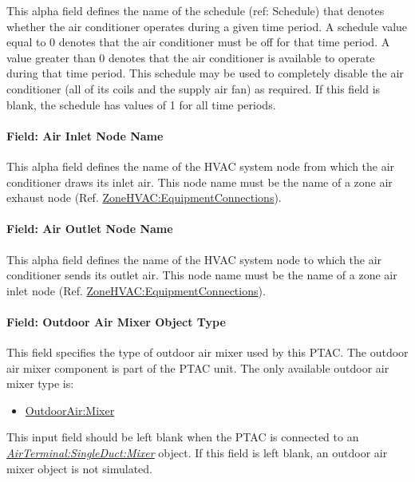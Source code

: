 This alpha field defines the name of the schedule (ref: Schedule) that denotes whether the air conditioner operates during a given time period. A schedule value equal to 0 denotes that the air conditioner must be off for that time period. A value greater than 0 denotes that the air conditioner is available to operate during that time period. This schedule may be used to completely disable the air conditioner (all of its coils and the supply air fan) as required. If this field is blank, the schedule has values of 1 for all time periods.

\paragraph{Field: Air Inlet Node Name}\label{field-air-inlet-node-name-5-001}

This alpha field defines the name of the HVAC system node from which the air conditioner draws its inlet air. This node name must be the name of a zone air exhaust node (Ref. \hyperref[zonehvacequipmentconnections]{ZoneHVAC:EquipmentConnections}).

\paragraph{Field: Air Outlet Node Name}\label{field-air-outlet-node-name-5-001}

This alpha field defines the name of the HVAC system node to which the air conditioner sends its outlet air. This node name must be the name of a zone air inlet node (Ref. \hyperref[zonehvacequipmentconnections]{ZoneHVAC:EquipmentConnections}).

\paragraph{Field: Outdoor Air Mixer Object Type}\label{field-outdoor-air-mixer-object-type-2}

This field specifies the type of outdoor air mixer used by this PTAC. The outdoor air mixer component is part of the PTAC unit. The only available outdoor air mixer type is:

\begin{itemize}
\tightlist
\item
  \hyperref[outdoorairmixer]{OutdoorAir:Mixer}
\end{itemize}

This input field should be left blank when the PTAC is connected to an \textit{\hyperref[airterminalsingleductmixer]{AirTerminal:SingleDuct:Mixer}} object. If this field is left blank, an outdoor air mixer object is not simulated.

